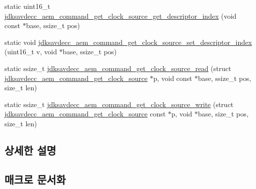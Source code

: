 \begin{DoxyCompactItemize}
\item 
static uint16\+\_\+t \hyperlink{group__command__get__clock__source_gaea409bd813a9ad907086fc6ef9f4bde0}{jdksavdecc\+\_\+aem\+\_\+command\+\_\+get\+\_\+clock\+\_\+source\+\_\+get\+\_\+descriptor\+\_\+index} (void const $\ast$base, ssize\+\_\+t pos)
\item 
static void \hyperlink{group__command__get__clock__source_gace3747d0301947f6ac72aad340698abb}{jdksavdecc\+\_\+aem\+\_\+command\+\_\+get\+\_\+clock\+\_\+source\+\_\+set\+\_\+descriptor\+\_\+index} (uint16\+\_\+t v, void $\ast$base, ssize\+\_\+t pos)
\item 
static ssize\+\_\+t \hyperlink{group__command__get__clock__source_ga01c3314a9a44a444ff295492418b5153}{jdksavdecc\+\_\+aem\+\_\+command\+\_\+get\+\_\+clock\+\_\+source\+\_\+read} (struct \hyperlink{structjdksavdecc__aem__command__get__clock__source}{jdksavdecc\+\_\+aem\+\_\+command\+\_\+get\+\_\+clock\+\_\+source} $\ast$p, void const $\ast$base, ssize\+\_\+t pos, size\+\_\+t len)
\item 
static ssize\+\_\+t \hyperlink{group__command__get__clock__source_gaf2e974459cddac4914a26fa862fcddc1}{jdksavdecc\+\_\+aem\+\_\+command\+\_\+get\+\_\+clock\+\_\+source\+\_\+write} (struct \hyperlink{structjdksavdecc__aem__command__get__clock__source}{jdksavdecc\+\_\+aem\+\_\+command\+\_\+get\+\_\+clock\+\_\+source} const $\ast$p, void $\ast$base, size\+\_\+t pos, size\+\_\+t len)
\end{DoxyCompactItemize}


\subsection{상세한 설명}


\subsection{매크로 문서화}
